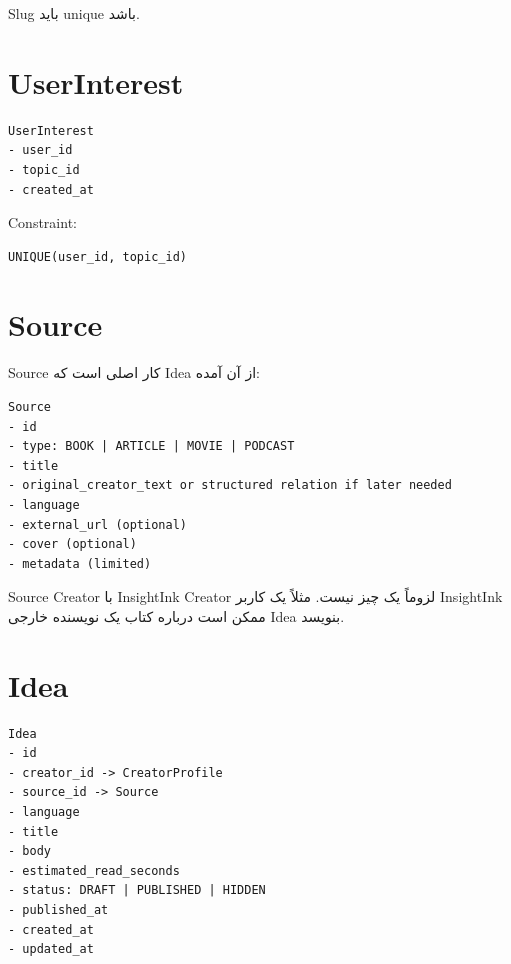 Slug باید unique باشد.

\section{UserInterest}

\begin{latin}
\begin{lstlisting}
UserInterest
- user_id
- topic_id
- created_at
\end{lstlisting}
\end{latin}

Constraint:
\begin{latin}
\begin{lstlisting}
UNIQUE(user_id, topic_id)
\end{lstlisting}
\end{latin}

\section{Source}

Source کار اصلی است که Idea از آن آمده:

\begin{latin}
\begin{lstlisting}
Source
- id
- type: BOOK | ARTICLE | MOVIE | PODCAST
- title
- original_creator_text or structured relation if later needed
- language
- external_url (optional)
- cover (optional)
- metadata (limited)
\end{lstlisting}
\end{latin}

\begin{warningbox}
Source Creator با InsightInk Creator لزوماً یک چیز نیست. مثلاً یک کاربر InsightInk ممکن است درباره کتاب یک نویسنده خارجی Idea بنویسد.
\end{warningbox}

\section{Idea}

\begin{latin}
\begin{lstlisting}
Idea
- id
- creator_id -> CreatorProfile
- source_id -> Source
- language
- title
- body
- estimated_read_seconds
- status: DRAFT | PUBLISHED | HIDDEN
- published_at
- created_at
- updated_at
\end{lstlisting}
\end{latin}

